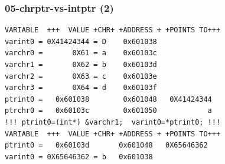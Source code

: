 \documentclass[xcolor=table, notheorems, hyperref={pdfpagelabels=false}]{beamer}
\begin{document}
\begin{frame}[fragile]
\frametitle{05-chrptr-vs-intptr (2)}
\begin{lstlisting}[basicstyle=\ttfamily\footnotesize]
VARIABLE  +++  VALUE +CHR+ +ADDRESS + +POINTS TO+++
varint0 = 0X41424344 = D    0x601038
varchr0 =       0X61 = a    0x60103c
varchr1 =       0X62 = b    0x60103d
varchr2 =       0X63 = c    0x60103e
varchr3 =       0X64 = d    0x60103f
ptrint0 =   0x601038        0x601048   0X41424344
ptrchr0 =   0x60103c        0x601050            a
!!! ptrint0=(int*) &varchr1;  varint0=*ptrint0; !!!
VARIABLE  +++  VALUE +CHR+ +ADDRESS + +POINTS TO+++
ptrint0 =   0x60103d       0x601048   0X65646362
varint0 = 0X65646362 = b   0x601038
\end{lstlisting}

\begin{minipage}[t]{120mm}
\end{minipage}

\end{frame}
\end{document}
